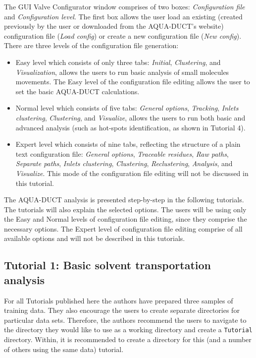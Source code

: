 \documentclass[9pt,tutorial, pubversion]{livecoms}
\begin{document}
The GUI Valve Configurator window comprises of two boxes: \textit{Configuration file} and \textit{Configuration level}. The first box allows the user load an existing (created previously by the user or downloaded from the AQUA-DUCT's website) configuration file (\textit{Load config}) or create a new configuration file (\textit{New config}). There are three levels of the configuration file generation:
\begin{itemize}
\item{Easy level} which consists of only three tabs: \textit{Initial}, \textit{Clustering}, and \textit{Visualization}, allows the users to run basic analysis of small molecules movements. The Easy level of the configuration file editing allows the user to set the basic AQUA-DUCT calculations.
\item{Normal level} which consists of five tabs: \textit{General options}, \textit{Tracking}, \textit{Inlets clustering}, \textit{Clustering}, and \textit{Visualize}, allows the users to run both basic and advanced analysis (such as hot-spots identification, as shown in Tutorial 4).
\item{Expert level} which consists of nine tabs, reflecting the structure of a plain text configuration file: \textit{General options}, \textit{Traceable residues}, \textit{Raw paths}, \textit{Separate paths}, \textit{Inlets clustering}, \textit{Clustering}, \textit{Reclustering}, \textit{Analysis}, and \textit{Visualize}. This mode of the configuration file editing will not be discussed in this tutorial.
\end{itemize}

The AQUA-DUCT analysis is presented step-by-step in the following tutorials. The tutorials will also explain the selected options. The users will be using only the Easy and Normal levels of configuration file editing, since they comprise the necessary options. The Expert level of configuration file editing comprise of all available options and will not be described in this tutorials.

\subsection{Tutorial 1: Basic solvent transportation analysis}
For all Tutorials published here the authors have prepared three samples of training data. They also encourage the users to create 
separate directories for particular data sets. Therefore, the authors recommend the users to navigate to the directory they would like to use as a working directory and create a \texttt{Tutorial} directory. Within, it is recommended to create a directory for this (and a number of others using the same data) tutorial. 
\end{document}
